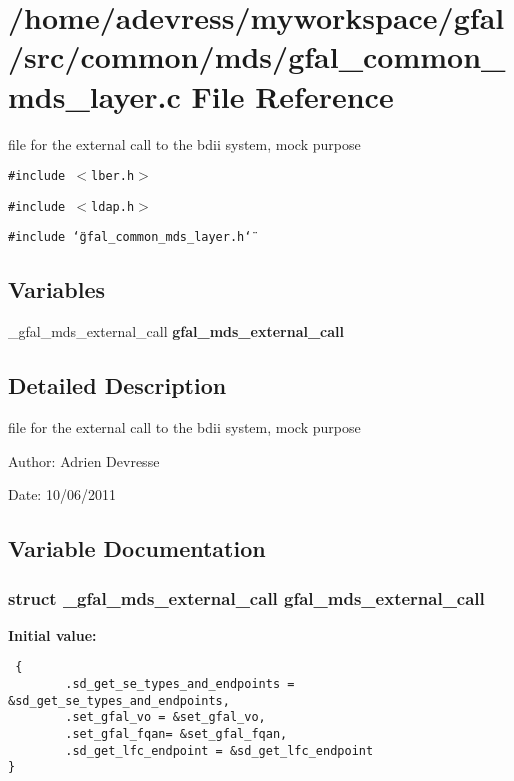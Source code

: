 \section{/home/adevress/myworkspace/gfal/src/common/mds/gfal\_\-common\_\-mds\_\-layer.c File Reference}
\label{gfal__common__mds__layer_8c}
file for the external call to the bdii system, mock purpose 

{\tt \#include $<$lber.h$>$}\par
{\tt \#include $<$ldap.h$>$}\par
{\tt \#include \char`\"{}gfal\_\-common\_\-mds\_\-layer.h\char`\"{}}\par
\subsection*{Variables}
\begin{CompactItemize}
\item 
\_\-gfal\_\-mds\_\-external\_\-call \textbf{gfal\_\-mds\_\-external\_\-call}
\end{CompactItemize}


\subsection{Detailed Description}
file for the external call to the bdii system, mock purpose 

\begin{Desc}
\item[Author:]Adrien Devresse \end{Desc}
\begin{Desc}
\item[Date:]10/06/2011 \end{Desc}


\subsection{Variable Documentation}
\subsubsection{\setlength{\rightskip}{0pt plus 5cm}struct \_\-gfal\_\-mds\_\-external\_\-call gfal\_\-mds\_\-external\_\-call}\label{gfal__common__mds__layer_8c_75521e039a2ade0b9db637dd099def98}


\textbf{Initial value:}

\begin{Code}\begin{verbatim} {
        .sd_get_se_types_and_endpoints = &sd_get_se_types_and_endpoints,
        .set_gfal_vo = &set_gfal_vo,
        .set_gfal_fqan= &set_gfal_fqan,
        .sd_get_lfc_endpoint = &sd_get_lfc_endpoint
}
\end{verbatim}\end{Code}
